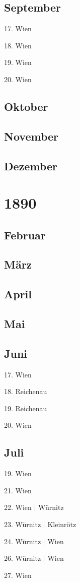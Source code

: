 \documentclass[twoside=false,titlepage=false,open=any, parskip=never, fontsize=10pt, headings=small, chapterprefix=false, appendixprefix=false, DIV=15]{scrbook}
\begin{document}
\begin{multicols}{3}
            \section*{September}
            17. Wien\par
            18. Wien\par
            19. Wien\par
            20. Wien\par
            \section*{Oktober}
            \section*{November}
            \section*{Dezember}
            \chapter*{1890}
            \section*{Februar}
            \section*{März}
            \section*{April}
            \section*{Mai}
            \section*{Juni}
            17. Wien\par
            18. Reichenau\par
            19. Reichenau\par
            20. Wien\par
            \section*{Juli}
            19. Wien\par
            21. Wien\par
            22. Wien | Würnitz\par
            23. Würnitz | Kleinrötz\par
            24. Würnitz | Wien\par
            26. Würnitz | Wien\par
            27. Wien\par

\end{multicols}
\end{document}

